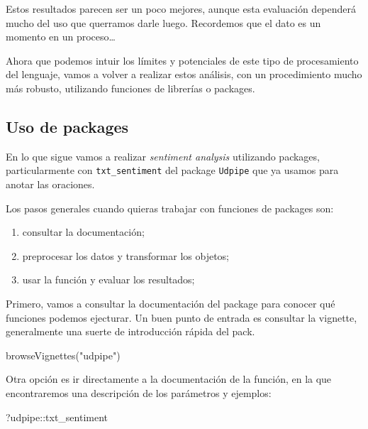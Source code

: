 \documentclass[
]{book}
\newenvironment{Shaded}{\begin{snugshade}}{\end{snugshade}}
\newcommand{\FunctionTok}[1]{\textcolor[rgb]{0.00,0.00,0.00}{#1}}
\newcommand{\NormalTok}[1]{#1}
\newcommand{\SpecialCharTok}[1]{\textcolor[rgb]{0.00,0.00,0.00}{#1}}
\newcommand{\StringTok}[1]{\textcolor[rgb]{0.31,0.60,0.02}{#1}}
\providecommand{\tightlist}{%
  \setlength{\itemsep}{0pt}\setlength{\parskip}{0pt}}
\begin{document}
Estos resultados parecen ser un poco mejores, aunque esta evaluación dependerá mucho del uso que querramos darle luego. Recordemos que el dato es un momento en un proceso\ldots{}

Ahora que podemos intuir los límites y potenciales de este tipo de procesamiento del lenguaje, vamos a volver a realizar estos análisis, con un procedimiento mucho más robusto, utilizando funciones de librerías o packages.

\hypertarget{uso-de-packages}{%
\subsection{Uso de packages}\label{uso-de-packages}}

En lo que sigue vamos a realizar \emph{sentiment analysis} utilizando packages, particularmente con \texttt{txt\_sentiment} del package \texttt{Udpipe} que ya usamos para anotar las oraciones.

Los pasos generales cuando quieras trabajar con funciones de packages son:

\begin{enumerate}
\def\labelenumi{\arabic{enumi}.}
\tightlist
\item
  consultar la documentación;
\item
  preprocesar los datos y transformar los objetos;
\item
  usar la función y evaluar los resultados;
\end{enumerate}

Primero, vamos a consultar la documentación del package para conocer qué funciones podemos ejecturar.
Un buen punto de entrada es consultar la vignette, generalmente una suerte de introducción rápida del pack.

\begin{Shaded}
\begin{Highlighting}[]
\FunctionTok{browseVignettes}\NormalTok{(}\StringTok{"udpipe"}\NormalTok{)}
\end{Highlighting}
\end{Shaded}

Otra opción es ir directamente a la documentación de la función, en la que encontraremos una descripción de los parámetros y ejemplos:

\begin{Shaded}
\begin{Highlighting}[]
\NormalTok{?udpipe}\SpecialCharTok{::}\NormalTok{txt\_sentiment}
\end{Highlighting}
\end{Shaded}
\end{document}
